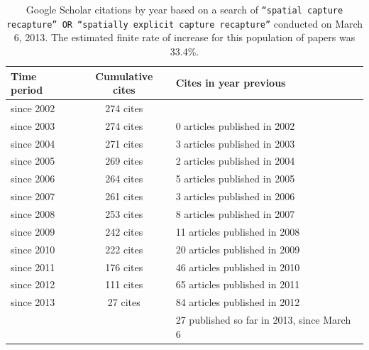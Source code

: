 \begin{table}[ht]
\caption{Google Scholar citations by year based on a search of
{\tt ``spatial capture recapture'' OR ``spatially explicit
capture recapture''} conducted on March 6, 2013. The estimated finite
rate of increase for this population of papers was 33.4\%.
}
\begin{tabular}{lcl} \hline \hline
Time period & Cumulative cites & Cites in year previous \\ \hline
since 2002 & 274 cites & \\
since 2003 & 274 cites &0 articles published in 2002 \\
since 2004 & 271 cites &3 articles published in 2003 \\
since 2005 & 269 cites &2 articles published in 2004 \\
since 2006 & 264 cites &5 articles published in 2005 \\
since 2007 & 261 cites &3 articles published in 2006 \\
since 2008 & 253 cites &8 articles published in 2007 \\
since 2009 & 242 cites &11 articles published in 2008 \\
since 2010 & 222 cites &20 articles published in 2009 \\
since 2011 & 176 cites &46 articles published in 2010 \\
since 2012 & 111 cites &65 articles published in 2011 \\
since 2013 & 27 cites &84 articles published in 2012 \\
& &27 published so far in 2013, since March 6
\\ \hline
\end{tabular}
\label{last.tab.cites}
\end{table}

